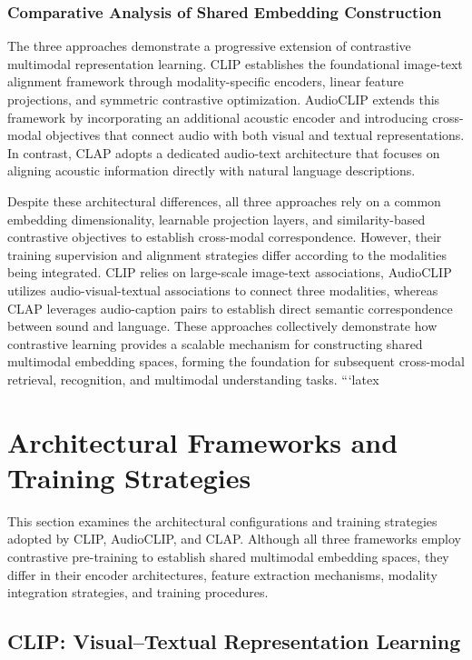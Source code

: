\documentclass[pdflatex,sn-mathphys-num]{sn-jnl}%
\theoremstyle{thmstyleone}%
\theoremstyle{thmstyletwo}%
\theoremstyle{thmstylethree}%
\begin{document}
\subsubsection{Comparative Analysis of Shared Embedding Construction}

The three approaches demonstrate a progressive extension of contrastive multimodal representation learning. CLIP establishes the foundational image-text alignment framework through modality-specific encoders, linear feature projections, and symmetric contrastive optimization. AudioCLIP extends this framework by incorporating an additional acoustic encoder and introducing cross-modal objectives that connect audio with both visual and textual representations. In contrast, CLAP adopts a dedicated audio-text architecture that focuses on aligning acoustic information directly with natural language descriptions.

Despite these architectural differences, all three approaches rely on a common embedding dimensionality, learnable projection layers, and similarity-based contrastive objectives to establish cross-modal correspondence. However, their training supervision and alignment strategies differ according to the modalities being integrated. CLIP relies on large-scale image-text associations, AudioCLIP utilizes audio-visual-textual associations to connect three modalities, whereas CLAP leverages audio-caption pairs to establish direct semantic correspondence between sound and language. These approaches collectively demonstrate how contrastive learning provides a scalable mechanism for constructing shared multimodal embedding spaces, forming the foundation for subsequent cross-modal retrieval, recognition, and multimodal understanding tasks.
```latex
\section{Architectural Frameworks and Training Strategies}\label{sec5}

This section examines the architectural configurations and training strategies adopted by CLIP, AudioCLIP, and CLAP. Although all three frameworks employ contrastive pre-training to establish shared multimodal embedding spaces, they differ in their encoder architectures, feature extraction mechanisms, modality integration strategies, and training procedures.

\subsection{CLIP: Visual--Textual Representation Learning}
\end{document}
